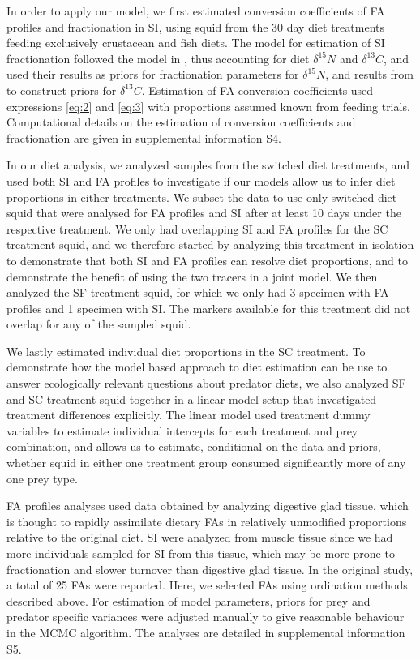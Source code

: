 \documentclass[fleqn,10pt]{wlpeerj}
\begin{document}
In order to apply our model, we first estimated conversion
coefficients of FA profiles and fractionation in SI, using squid from the 30
day diet treatments feeding exclusively crustacean and fish diets. The
model for estimation of SI fractionation followed the model in
\citet{hussey_rescaling_2014}, thus accounting for diet $\delta^{15}N$
and $\delta^{13}C$, and used their results as priors for fractionation
parameters for $\delta^{15}N$, and results from \citet{caut_variation_2009} to
construct priors for $\delta^{13}C$. Estimation of FA conversion coefficients used expressions \eqref{eq:2} and \eqref{eq:3} with proportions assumed known from feeding
 trials. Computational details on the estimation of conversion coefficients and
 fractionation are given in supplemental information S4.

In our diet analysis, we analyzed samples from the switched diet treatments, and
used both SI and FA profiles to investigate if our models allow us to infer diet
proportions in either treatments. We subset the data to use only
switched diet squid that were analysed for FA profiles and SI after at least
10 days under the respective treatment. We only had overlapping
SI and FA profiles for the SC treatment squid, and we therefore started by analyzing this treatment in isolation to
demonstrate that both SI and FA profiles can resolve diet proportions, and to
demonstrate the benefit of using the two tracers in a joint model. We
then analyzed the SF treatment squid, for which we only had 3 specimen with FA profiles
and 1 specimen with SI. The markers available for this treatment did
not overlap for any of the sampled squid. 

We lastly estimated individual diet proportions in the SC
treatment. To demonstrate how the model based approach to diet estimation can be
use to answer ecologically relevant questions about predator
diets, we also analyzed SF and SC treatment squid together in a linear model
setup that investigated treatment differences explicitly. The linear
model used treatment dummy variables to estimate individual intercepts
for each treatment and prey combination, and allows us to estimate,
conditional on the data and priors, whether squid in either one
treatment group consumed significantly more of any one prey type.

FA profiles analyses used data obtained by analyzing digestive glad tissue, which is thought to
rapidly assimilate dietary FAs in relatively unmodified
proportions relative to the original diet. SI were analyzed from
muscle tissue since we had more individuals sampled for SI from this tissue, which may be more prone to fractionation and slower
turnover than digestive glad tissue. In the original study, a total of
25 FAs were reported. Here, we selected FAs using ordination
methods described above. For estimation of model parameters, priors for
prey and predator specific variances were adjusted manually to give
reasonable behaviour in the MCMC algorithm. The analyses are detailed
in supplemental information S5.
\end{document}
